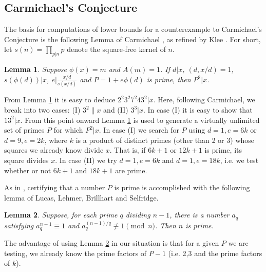 \documentclass[11pt]{amsart}
\theoremstyle{remark}
\theoremstyle{plain}
\newtheorem{lem}{Lemma}[section]
\numberwithin{equation}{section}
\renewcommand{\(}{\left(}
\renewcommand{\)}{\right)}
\begin{document}
\subsection{Carmichael's Conjecture}
\medskip
The basis for computations of lower bounds for a counterexample to
Carmichael's Conjecture is the following Lemma of Carmichael \cite{C2},
as refined by Klee \cite{K}.  For short, let $s(n)=\prod_{p|n} p$ denote the
square-free kernel of $n$.

\begin{lem}\label{CK} Suppose $\phi(x)=m$ and $A(m)=1$.  If $d|x$, $(d,x/d)=1$,
$s(\phi(d))|x$, $e | \frac{x/d}{s(x/d)}$ and $P=1+e\phi(d)$ is prime, then
$P^2|x$.
\end{lem}

From Lemma \ref{CK} it is easy to deduce $2^2 3^2 7^2 43^2|x$.  Here,
following Carmichael, we break into two cases: (I) $3^2\parallel x$ and
(II) $3^3|x$.  In case (I) it is easy to show that $13^2|x$.  From this point
onward Lemma \ref{CK} is used to generate a virtually unlimited set of
primes $P$ for which $P^2|x$.  In case (I) we search for $P$ using
$d=1,e=6k$ or $d=9,e=2k$, where $k$ is a product of distinct primes
(other than 2 or 3) whose squares we already know divide $x$.  That is,
if $6k+1$ or $12k+1$ is prime, its square divides $x$.  In case (II) we try
$d=1,e=6k$ and $d=1,e=18k$, i.e. we test whether or not $6k+1$ and $18k+1$
are prime.


As in \cite{SW}, certifying that a number $P$ is prime is accomplished
with the following lemma of Lucas, Lehmer, Brillhart and Selfridge.


\begin{lem}\label{LLBS} Suppose, for each prime $q$ dividing $n-1$,
there is a number $a_q$ satisfying $a_q^{n-1} \equiv 1$ and 
$a_q^{(n-1)/q} \not\equiv 1 \pmod{n}$.  Then $n$ is prime.
\end{lem}

The advantage of using Lemma \ref{LLBS} in our situation is that for a
given $P$ we are testing, we already know the prime factors of $P-1$
(i.e. 2,3 and the prime factors of $k$).
\end{document}
